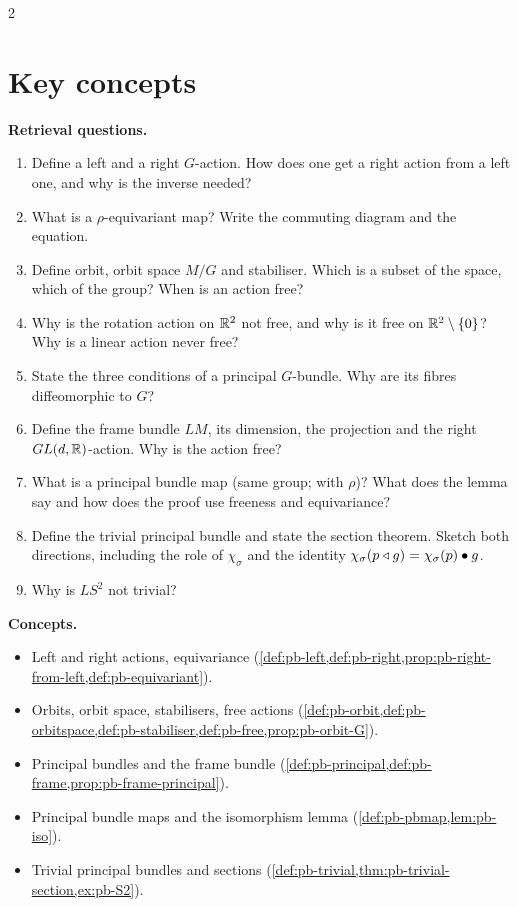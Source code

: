 \begin{paracol}{2}
\section*{Key concepts}
\begin{keyconcepts}
\textbf{Retrieval questions.}
\begin{enumerate}
  \item Define a left and a right $G$-action. How does one get a right action from a left one, and why is the inverse needed?
  \item What is a $\rho$-equivariant map? Write the commuting diagram and the equation.
  \item Define orbit, orbit space $M/G$ and stabiliser. Which is a subset of the space, which of the group? When is an action free?
  \item Why is the rotation action on $\mathbb{R}^2$ not free, and why is it free on $\mathbb{R}^2\setminus\{0\}$? Why is a linear action never free?
  \item State the three conditions of a principal $G$-bundle. Why are its fibres diffeomorphic to $G$?
  \item Define the frame bundle $LM$, its dimension, the projection and the right $GL(d,\mathbb{R})$-action. Why is the action free?
  \item What is a principal bundle map (same group; with $\rho$)? What does the lemma say and how does the proof use freeness and equivariance?
  \item Define the trivial principal bundle and state the section theorem. Sketch both directions, including the role of $\chi_\sigma$ and the identity $\chi_\sigma(p\mathbin{\triangleleft} g)=\chi_\sigma(p)\bullet g$.
  \item Why is $LS^2$ not trivial?
\end{enumerate}
\textbf{Concepts.}
\begin{itemize}
  \item Left and right actions, equivariance (\cref{def:pb-left,def:pb-right,prop:pb-right-from-left,def:pb-equivariant}).
  \item Orbits, orbit space, stabilisers, free actions (\cref{def:pb-orbit,def:pb-orbitspace,def:pb-stabiliser,def:pb-free,prop:pb-orbit-G}).
  \item Principal bundles and the frame bundle (\cref{def:pb-principal,def:pb-frame,prop:pb-frame-principal}).
  \item Principal bundle maps and the isomorphism lemma (\cref{def:pb-pbmap,lem:pb-iso}).
  \item Trivial principal bundles and sections (\cref{def:pb-trivial,thm:pb-trivial-section,ex:pb-S2}).
\end{itemize}
\end{keyconcepts}

\flushside
\end{paracol}
